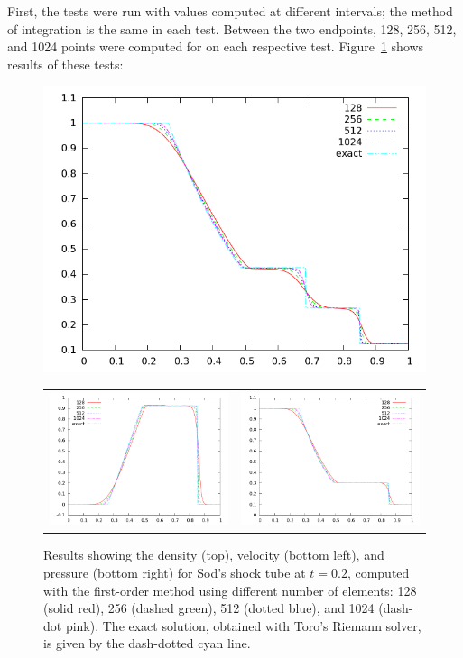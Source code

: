 \documentclass[10pt]{article}
\begin{document}
First, the tests were run with values computed at different intervals; the method of integration is the same in each test. Between the two endpoints, 128, 256, 512, and 1024 points were computed for on each respective test. Figure~\ref{fig:dencellcomp_20} shows results of these tests:
\begin{figure}[h!]
  \begin{center}
    \includegraphics[width=.95\textwidth]{dencellcomp_20}
    \begin{tabular}{cc}
      \includegraphics[width=.475\textwidth]{velcellcomp_20} &
      \includegraphics[width=.475\textwidth]{prscellcomp_20}
    \end{tabular}
  \end{center}
  \caption{Results showing the density (top), velocity (bottom left), and pressure (bottom right) for Sod's shock tube at $t=0.2$, computed with the first-order method using different number of elements: 128 (solid red), 256 (dashed green), 512 (dotted blue), and 1024 (dash-dot pink).  The exact solution, obtained with Toro's Riemann solver, is given by the dash-dotted cyan line.}
  \label{fig:dencellcomp_20}
\end{figure}
\end{document}
